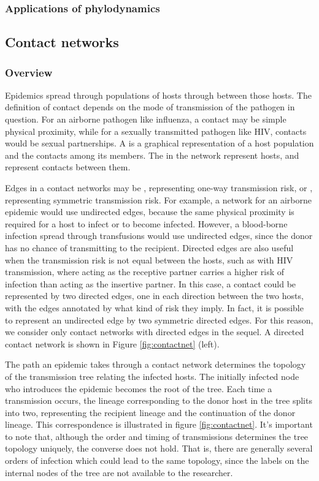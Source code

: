 \subsubsection{Applications of phylodynamics}
\label{subsubsec:appphylo}

\subsection{Contact networks}
\label{subsec:contactnet}

\subsubsection{Overview}

Epidemics spread through populations of hosts through  between
those hosts. The definition of contact depends on the mode of transmission of
the pathogen in question. For an airborne pathogen like influenza, a contact
may be simple physical proximity, while for a sexually transmitted pathogen
like HIV, contacts would be sexual partnerships. A  is a
graphical representation of a host population and the contacts among its
members. The  in the network represent hosts, and 
represent contacts between them. 

Edges in a contact networks may be , representing one-way
transmission risk, or , representing symmetric transmission
risk. For example, a network for an airborne epidemic would use undirected
edges, because the same physical proximity is required for a host to infect or
to become infected. However, a blood-borne infection spread through
transfusions would use undirected edges, since the donor has no chance of
transmitting to the recipient. Directed edges are also useful when the
transmission risk is not equal between the hosts, such as with HIV
transmission, where acting as the receptive partner carries a higher risk of
infection than acting as the insertive partner. In this case, a contact could
be represented by two directed edges, one in each direction between the two
hosts, with the edges annotated by what kind of risk they imply. In fact, it is
possible to represent an undirected edge by two symmetric directed edges. For
this reason, we consider only contact networks with directed edges in the
sequel. A directed contact network is shown in Figure \ref{fig:contactnet}
(left).

The path an epidemic takes through a contact network determines the topology of
the transmission tree relating the infected hosts. The initially infected node
who introduces the epidemic becomes the root of the tree. Each time a
transmission occurs, the lineage corresponding to the donor host in the tree
splits into two, representing the recipient lineage and the continuation of the
donor lineage. This correspondence is illustrated in figure
\ref{fig:contactnet}. It's important to note that, although the order and
timing of transmissions determines the tree topology uniquely, the converse
does not hold. That is, there are generally several orders of infection which
could lead to the same topology, since the labels on the internal nodes of the
tree are not available to the researcher.


